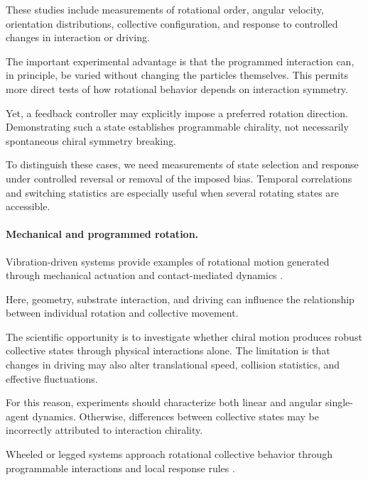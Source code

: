 These studies include
measurements of rotational
order, angular velocity,
orientation distributions,
collective configuration,
and response to controlled
changes in interaction
or driving.

The important experimental
advantage is that the
programmed interaction
can, in principle,
be varied without
changing the particles
themselves. This
permits more direct
tests of how rotational
behavior depends on
interaction symmetry.

Yet, a feedback controller
may explicitly impose
a preferred rotation
direction. Demonstrating
such a state establishes
programmable chirality,
not necessarily
spontaneous chiral
symmetry breaking.

To distinguish these
cases, we need
measurements of state
selection and response
under controlled
reversal or removal
of the imposed bias.
Temporal correlations
and switching statistics
are especially useful
when several rotating
states are accessible.

\paragraph*{Mechanical and programmed rotation.}

Vibration-driven systems
provide examples of rotational
motion generated through
mechanical actuation and
contact-mediated dynamics
\cite{Xi2024beamsbotsandbey,Li2022chiralseparationof,Scholz2018rotatingrobotsmove,Ma2025simplerobotswarmw,Noirhomme2024brainbotsassmarta,Callegari2024activematterexperi,Li2013asymmetricgearrect,Bashkova2026differentialequatio,He2022dynamicbehaviorof}.

Here, geometry, substrate
interaction, and driving
can influence the
relationship between
individual rotation
and collective movement.

The scientific opportunity
is to investigate
whether chiral motion
produces robust collective
states through physical
interactions alone.
The limitation is
that changes in
driving may also
alter translational
speed, collision
statistics, and
effective fluctuations.

For this reason,
experiments should
characterize both
linear and angular
single-agent dynamics.
Otherwise, differences
between collective
states may be
incorrectly attributed
to interaction
chirality.

Wheeled or legged
systems approach
rotational collective
behavior through
programmable interactions
and local response rules
\cite{Fruchart2022nonreciprocalphase,Paramanick2024emergenceofrunand,Vega2023indirectswarmcontr,Zhou2024anticipationpromote,Zheng2024bodyorientationcha,Castro2025visualcollectivebe,Jianchao2024emergentchiralitya,Dizenhaus2026anonymousleadership,Beattie2025realizingemergentc,Zheng2024emergenceofcollect,Raoufi2023individualityinswa,Zheng2020experimentalcapabil,Makino2004collectivebehavior,Fruchart2020phasetransitionsin,Li2020selfpropulsiononsa}.

